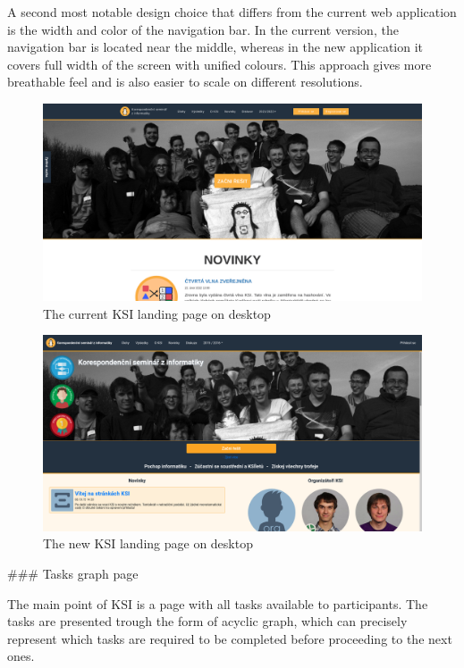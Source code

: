 \documentclass[
  digital, %
  oneside, %
  lof,     %
  lot,     %
]{fithesis4}
\begin{document}
{A second most notable design choice that differs from the current web application is the width and color of the navigation bar. In the current version, the navigation bar is located near the middle, whereas in the new application it covers full width of the screen with unified colours. This approach gives more breathable feel and is also easier to scale on different resolutions.

\begin{figure}
\includegraphics[width=\textwidth]{assets/img/welcome_curr}
\caption{The current KSI landing page on desktop}
\label{fig:welcome-curr}
\end{figure}

\begin{figure}
\includegraphics[width=\textwidth]{assets/img/welcome_new}
\caption{The new KSI landing page on desktop}
\label{fig:welcome-new}
\end{figure}

### Tasks graph page

The main point of KSI is a page with all tasks available to participants. The tasks are presented trough the form of acyclic graph, which can precisely represent which tasks are required to be completed before proceeding to the next ones.

}
\end{document}
